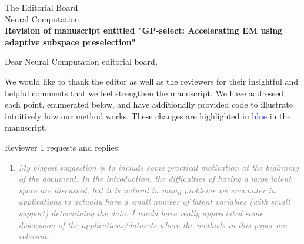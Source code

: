 \documentclass[10pt]{letter}
\newcommand{\rvr}[1]{\textcolor{gray}{#1}}
\begin{document}
\begin{letter}{
The Editorial Board\\
Neural Computation\\
\vspace{10mm}
\textbf{Revision of manuscript entitled "GP-select: Accelerating EM using adaptive
subspace preselection"}
}

%
%
%
%
%
%
% 

\opening{Dear Neural Computation editorial board,}

We would like to thank the editor as well as the reviewers for their insightful and helpful comments that we feel strengthen the manuscript.  We have addressed each point, enumerated below, and have additionally provided code to illustrate intuitively how our method works. These changes are highlighted in \textcolor{blue}{blue} in the manuscript.


Reviewer 1 requests and replies:

\begin{enumerate}[topsep=3pt,itemsep=2ex,partopsep=1ex,parsep=1ex]
    \item \rvr{\emph{My biggest suggestion is to include some practical motivation at the beginning of the document. In the introduction, the difficulties of having a large latent space are discussed, but it is natural in many problems we encounter in applications to actually have a small number of latent variables (with small support) determining the data. I would have really appreciated some discussion of the applications/datasets where the methods in this paper are relevant.}}


\end{enumerate}
\end{letter}
\end{document}
